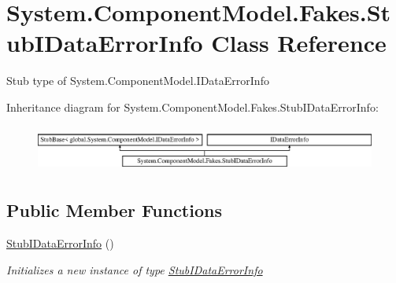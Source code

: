 \hypertarget{class_system_1_1_component_model_1_1_fakes_1_1_stub_i_data_error_info}{\section{System.\-Component\-Model.\-Fakes.\-Stub\-I\-Data\-Error\-Info Class Reference}
\label{class_system_1_1_component_model_1_1_fakes_1_1_stub_i_data_error_info}
}


Stub type of System.\-Component\-Model.\-I\-Data\-Error\-Info 


Inheritance diagram for System.\-Component\-Model.\-Fakes.\-Stub\-I\-Data\-Error\-Info\-:\begin{figure}[H]
\begin{center}
\leavevmode
\includegraphics[height=1.551247cm]{class_system_1_1_component_model_1_1_fakes_1_1_stub_i_data_error_info}
\end{center}
\end{figure}
\subsection*{Public Member Functions}
\begin{DoxyCompactItemize}
\item 
\hyperlink{class_system_1_1_component_model_1_1_fakes_1_1_stub_i_data_error_info_ac4094cd89e452db1f371411963c52b0d}{Stub\-I\-Data\-Error\-Info} ()
\begin{DoxyCompactList}\small\item\em Initializes a new instance of type \hyperlink{class_system_1_1_component_model_1_1_fakes_1_1_stub_i_data_error_info}{Stub\-I\-Data\-Error\-Info}\end{DoxyCompactList}\end{DoxyCompactItemize}
